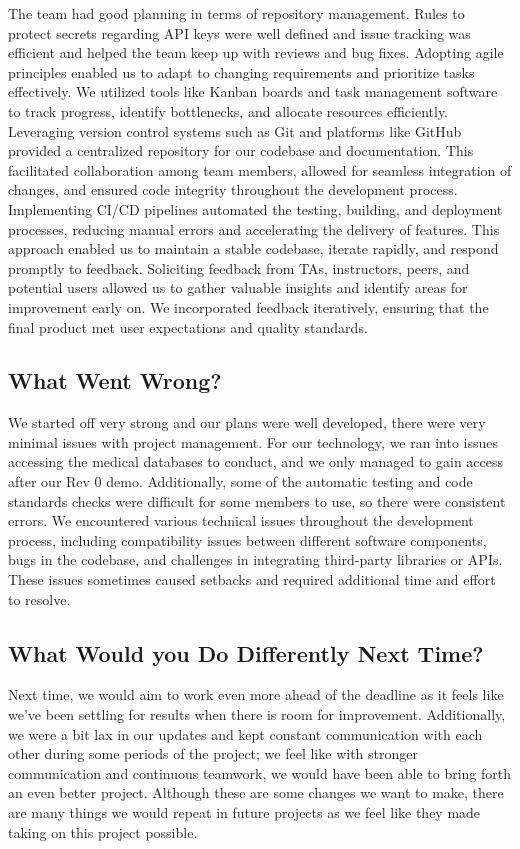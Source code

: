 \documentclass{article}
\begin{document}
The team had good planning in terms of repository management. Rules to protect secrets regarding API keys were well defined and issue tracking was efficient and helped the team keep up with reviews and bug fixes. Adopting agile principles enabled us to adapt to changing requirements and prioritize tasks effectively. We utilized tools like Kanban boards and task management software to track progress, identify bottlenecks, and allocate resources efficiently. Leveraging version control systems such as Git and platforms like GitHub provided a centralized repository for our codebase and documentation. This facilitated collaboration among team members, allowed for seamless integration of changes, and ensured code integrity throughout the development process.  Implementing CI/CD pipelines automated the testing, building, and deployment processes, reducing manual errors and accelerating the delivery of features. This approach enabled us to maintain a stable codebase, iterate rapidly, and respond promptly to feedback. Soliciting feedback from TAs, instructors, peers, and potential users allowed us to gather valuable insights and identify areas for improvement early on. We incorporated feedback iteratively, ensuring that the final product met user expectations and quality standards.


\subsection{What Went Wrong?}

We started off very strong and our plans were well developed, there were very minimal issues with project management. For our technology, we ran into issues accessing the medical databases to conduct, and we only managed to gain access after our Rev 0 demo. Additionally, some of the automatic testing and code standards checks were difficult for some members to use, so there were consistent errors. We encountered various technical issues throughout the development process, including compatibility issues between different software components, bugs in the codebase, and challenges in integrating third-party libraries or APIs. These issues sometimes caused setbacks and required additional time and effort to resolve.
\subsection{What Would you Do Differently Next Time?}


Next time, we would aim to work even more ahead of the deadline as it feels like we've been settling for results when there is room for improvement. Additionally, we were a bit lax in our updates and kept constant communication with each other during some periods of the project; we feel like with stronger communication and continuous teamwork, we would have been able to bring forth an even better project. Although these are some changes we want to make, there are many things we would repeat in future projects as we feel like they made taking on this project possible.   
\end{document}
